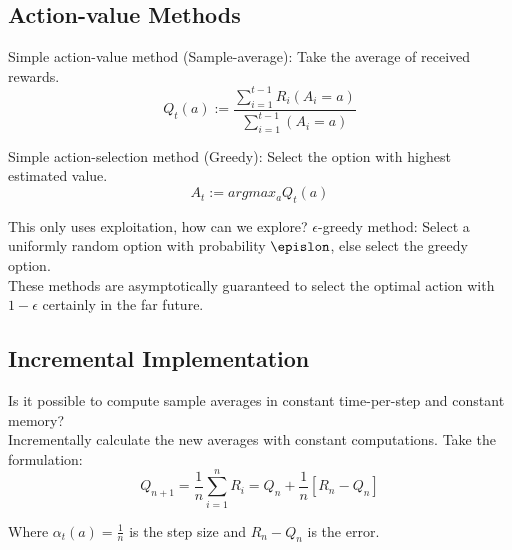 \documentclass[a4paper]{article}
\begin{document}
\subsection{Action-value Methods}
Simple action-value method (Sample-average): Take the average of received rewards. $$Q_t(a) := \frac{\sum_{i=1}^{t-1}R_i(A_i = a)}{\sum_{i=1}^{t-1}(A_i = a)}$$

Simple action-selection method (Greedy): Select the option with highest estimated value. $$A_t := argmax_aQ_t(a)$$

This only uses exploitation, how can we explore? $\epsilon$-greedy method: Select a uniformly random option with probability $\epislon$, else select the greedy option.\\
These methods are asymptotically guaranteed to select the optimal action with $1 - \epsilon$ certainly in the far future.

\subsection{Incremental Implementation}
Is it possible to compute sample averages in constant time-per-step and constant memory?\\

Incrementally calculate the new averages with constant computations. Take the formulation: $$Q_{n+1} = \frac{1}{n}\sum_{i=1}^nR_i = Q_n + \frac{1}{n}[R_n - Q_n]$$

Where $\alpha_t(a) = \frac{1}{n}$ is the step size and $R_n - Q_n$ is the error.\\
\end{document}
